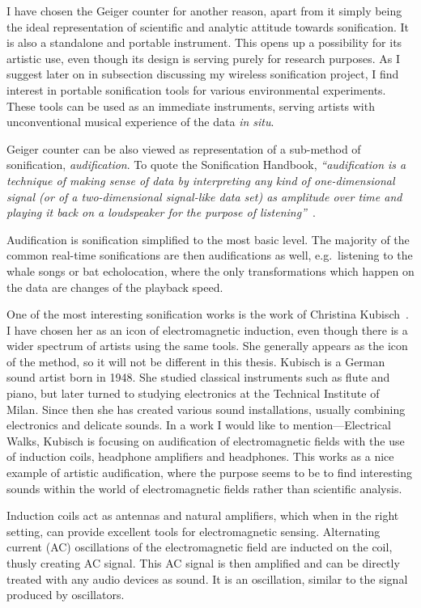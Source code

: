 \documentclass[12pt,a4paper,oneside]{report}
\begin{document}
I have chosen the Geiger counter for another reason, apart from it simply being the ideal representation of scientific and analytic attitude towards sonification. It is also a standalone and portable instrument. This opens up a possibility for its artistic use, even though its design is serving purely for research purposes. As I suggest later on in subsection discussing my wireless sonification project, I find interest in portable sonification tools for various environmental experiments. These tools can be used as an immediate instruments, serving artists with unconventional musical experience of the data \emph{in situ}.  

Geiger counter can be also viewed as representation of a sub-method of sonification, \emph{audification}. To quote the Sonification Handbook,  \emph{``audification is a technique of making sense of data by interpreting any kind of one-dimensional signal (or of a two-dimensional signal-like data set) as amplitude over time and playing it back on a loudspeaker for the purpose of listening''}~\cite[p.~301]{audif}.

Audification is sonification simplified to the most basic level. The majority of the common real-time sonifications are then audifications as well, e.g.\ listening to the whale songs or bat echolocation, where the only transformations which happen on the data are changes of the playback speed.

One of the most interesting sonification works is the work of Christina Kubisch~\cite{ChKubisch2012}. I have chosen her as an icon of electromagnetic induction, even though there is a wider spectrum of artists using the same tools. She generally appears as the icon of the method, so it will not be different in this thesis. Kubisch is a German sound artist born in 1948. She studied classical instruments such as flute and piano, but later turned to studying electronics at the Technical Institute of Milan. Since then she has created various sound installations, usually combining electronics and delicate sounds. In a work I would like to mention---Electrical Walks, Kubisch is focusing on audification of electromagnetic fields with the use of induction coils, headphone amplifiers and headphones. This works as a nice example of artistic audification, where the purpose seems to be to find interesting sounds within the world of electromagnetic fields rather than scientific analysis. 

Induction coils act as antennas and natural amplifiers, which when in the right setting, can provide excellent tools for electromagnetic sensing. Alternating current (AC) oscillations of the electromagnetic field are inducted on the coil, thusly creating AC signal. This AC signal is then amplified and can be directly treated with any audio devices as sound. It is an oscillation, similar to the signal produced by oscillators.
\end{document}
